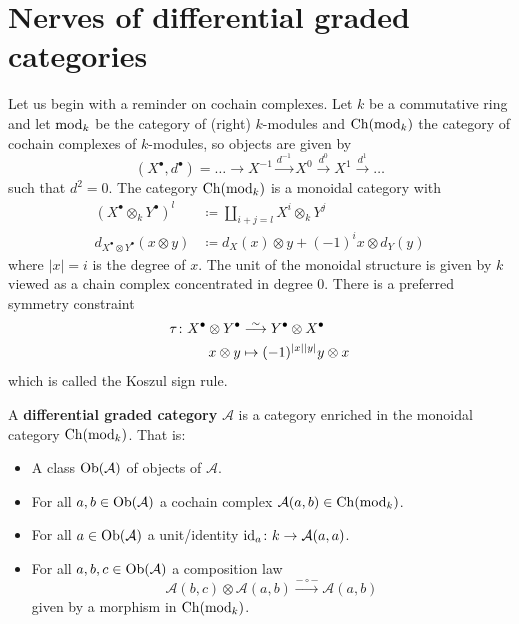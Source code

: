 \section{Nerves of differential graded categories}

Let us begin with a reminder on cochain complexes.
Let $ k $ be a commutative ring and let $ \operatorname{mod}_k $ be the category of (right) $ k $-modules
and $ \operatorname{Ch} ( \operatorname{mod}_k ) $ the category of cochain complexes of $ k $-modules, so objects are given by
\[
	( X^\bullet , d^\bullet )
	=
	\dotsc 
	\to 
	X^{ - 1 }
	\xrightarrow{ d^{ - 1 } }
	X^0
	\xrightarrow{ d^0 }
	X^1
	\xrightarrow{ d^1 } 
	\dotsc 
\]
such that $ d^2 = 0 $.
The category $ \operatorname{Ch} ( \operatorname{mod}_k ) $ is a monoidal category with 
\begin{align*}
	( X^\bullet \otimes_k Y^\bullet )^l 
	&\coloneqq
	\coprod_{ i + j = l } X^i \otimes_k Y^j 
	\\
	d_{ X^\bullet \otimes Y^\bullet } ( x \otimes y )
	&\coloneqq 
	d_X ( x ) \otimes y 
	+
	( - 1 )^i x \otimes d_Y ( y ) 
\end{align*}
where $ \lvert x \rvert = i $ is the degree of $ x $.
The unit of the monoidal structure is given by $ k $ viewed as a chain complex concentrated in degree $ 0 $.
There is a preferred symmetry constraint 
\begin{align*}
	\tau \colon X^\bullet \otimes Y^\bullet
	&\isomorphism
	Y^\bullet \otimes X^\bullet 
	\\
	x \otimes y 
	&\mapsto
	( - 1 )^{ \lvert x \rvert \lvert y \rvert }
	y \otimes x 
\end{align*}
which is called the Koszul sign rule.

\begin{defi}
	A \textbf{differential graded category} $ \mathcal{ A } $ is a category enriched in the monoidal category $ \operatorname{Ch} ( \operatorname{mod}_k ) $.
	That is:
	\begin{itemize}
		\item 
		A class $ \operatorname{Ob} ( \mathcal{ A } ) $ of objects of $ \mathcal{ A } $.
		
		\item 
		For all $ a , b \in \operatorname{Ob} ( \mathcal{ A } ) $ a cochain complex $ \mathcal{ A } ( a , b ) \in \operatorname{Ch} ( \operatorname{mod}_k ) $.
		
		\item 
		For all $ a  \in \operatorname{Ob} ( \mathcal{ A } ) $ a unit/identity $ \operatorname{id}_a  \colon k \to \mathcal{ A } ( a , a ) $.
		
		\item 
		For all $ a , b, c \in \operatorname{Ob}( \mathcal{ A } ) $ a composition law 
		\[
			\mathcal{ A }( b , c ) \otimes \mathcal{ A } ( a , b ) 
			\xrightarrow{ - \circ - }
			\mathcal{ A } ( a , b )
		\]
		given by a morphism in $ \operatorname{Ch} ( \operatorname{mod}_k ) $.
	\end{itemize}
\end{defi}

